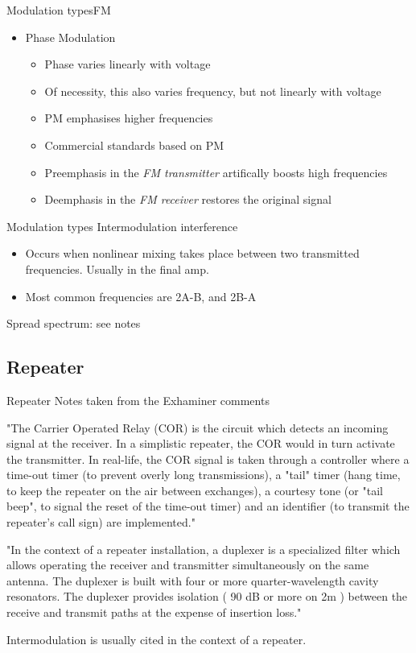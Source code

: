 \documentclass{beamer}
\begin{document}
\begin{frame}{Modulation types}{FM}
\begin{itemize}
\item Phase Modulation
\begin{itemize}
\item Phase varies linearly with voltage
\item Of necessity, this also varies frequency, but not linearly with voltage
\item PM emphasises higher frequencies
\item Commercial standards based on PM
\item Preemphasis in the {\em FM transmitter} artifically boosts high frequencies
\item Deemphasis in the {\em FM receiver} restores the original signal 
\end{itemize}
\end{itemize}

\end{frame}

\begin{frame}{Modulation types}{}
Intermodulation interference

\begin{itemize}
\item Occurs when nonlinear mixing takes place between two transmitted frequencies.  Usually in the final amp.
\item Most common frequencies are 2A-B, and 2B-A
\end{itemize}
\end{frame}

\begin{frame}
Spread spectrum:  see notes
\end{frame}

\subsection{Repeater}
\begin{frame}{Repeater}{}
Notes taken from the Exhaminer comments

"The Carrier Operated Relay (COR) is the circuit which detects an incoming signal at the receiver.  In a simplistic repeater, the COR would in turn activate the transmitter.  In real-life, the COR signal is taken through a controller where a time-out timer (to prevent overly long transmissions), a "tail" timer (hang time, to keep the repeater on the air between exchanges), a courtesy tone (or "tail beep", to signal the reset of the time-out timer) and an identifier (to transmit the repeater's call sign) are implemented."

"In the context of a repeater installation, a duplexer is a specialized filter which allows operating the receiver and transmitter simultaneously on the same antenna.  The duplexer is built with four or more quarter-wavelength cavity resonators.  The duplexer provides isolation ( 90 dB or more on 2m ) between the receive and transmit paths at the expense of insertion loss."

Intermodulation is usually cited in the context of a repeater.
\end{frame}
\end{document}
